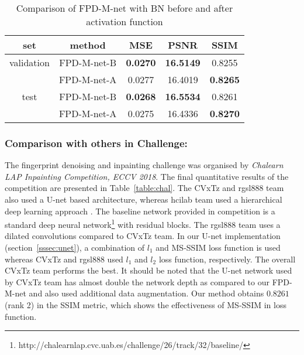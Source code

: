 \documentclass{llncs}
\begin{document}
\vspace{-0.3cm}
\begin{table}[h!]
\centering
\addtolength{\tabcolsep}{10pt}
\begin{tabular}{ c | c | c | c | c }
    \hline \hline
    set        & method    & MSE    & PSNR    & SSIM   \\ \hline \hline
    validation & FPD-M-net-B & \textbf{0.0270} & \textbf{16.5149} & 0.8255 \\
               & FPD-M-net-A & 0.0277 & 16.4019 & \textbf{0.8265} \\
    \hline
    test       & FPD-M-net-B & \textbf{0.0268} & \textbf{16.5534} & 0.8261 \\
               & FPD-M-net-A & 0.0275 & 16.4336 & \textbf{0.8270} \\ \hline\hline
\end{tabular}
\caption{Comparison of FPD-M-net with BN before and after activation function}
\label{table:mnetcmp}
\end{table}
\vspace{-1.0cm}

\subsubsection{Comparison with others in Challenge:}
\label{sssec:challenge}
The fingerprint denoising and inpainting challenge was organised by \textit{Chalearn LAP Inpainting Competition, ECCV 2018}. The final quantitative results of the competition are presented in Table~\ref{table:chal}. The CVxTz and rgsl888 team also used a U-net \cite{ronneberger2015u} based architecture, whereas hcilab team used a hierarchical deep learning approach \cite{salakhutdinov2013learning}. The baseline network provided in competition is a standard deep neural network\footnote{http://chalearnlap.cvc.uab.es/challenge/26/track/32/baseline/} with residual blocks. The rgsl888 team uses a dilated convolutions compared to CVxTz team. In our U-net implementation (section~\ref{sssec:unet}), a combination of $l_1$ and MS-SSIM loss function is used whereas CVxTz and rgsl888 used $l_1$ and $l_2$ loss function, respectively. The overall CVxTz team performs the best. It should be noted that the U-net network used by CVxTz team has almost double the network depth as compared to our FPD-M-net and also used additional data augmentation. Our method obtains $0.8261$ (rank 2) in the SSIM metric, which shows the effectiveness of MS-SSIM in loss function.
\end{document}
